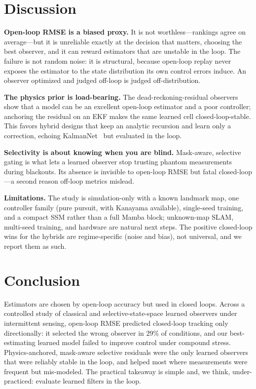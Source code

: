 \documentclass[10pt]{article}
\begin{document}
\section{Discussion}
\textbf{Open-loop RMSE is a biased proxy.} It is not worthless---rankings agree on average---but it
is unreliable exactly at the decision that matters, choosing the best observer, and it can reward
estimators that are unstable in the loop. The failure is not random noise: it is structural, because
open-loop replay never exposes the estimator to the state distribution its own control errors
induce. An observer optimized and judged off-loop is judged off-distribution.

\textbf{The physics prior is load-bearing.} The dead-reckoning-residual observers show that a model
can be an excellent open-loop estimator and a poor controller; anchoring the residual on an EKF
makes the same learned cell closed-loop-stable. This favors hybrid designs that keep an analytic
recursion and learn only a correction, echoing KalmanNet~\cite{kalmannet} but evaluated in the loop.

\textbf{Selectivity is about knowing when you are blind.} Mask-aware, selective gating is what lets
a learned observer stop trusting phantom measurements during blackouts. Its absence is invisible to
open-loop RMSE but fatal closed-loop---a second reason off-loop metrics mislead.

\textbf{Limitations.} The study is simulation-only with a known landmark map, one controller family
(pure pursuit, with Kanayama available), single-seed training, and a compact SSM rather than a
full Mamba block; unknown-map SLAM, multi-seed training, and hardware are natural next steps. The
positive closed-loop wins for the hybrids are regime-specific (noise and bias), not universal, and
we report them as such.

\section{Conclusion}
Estimators are chosen by open-loop accuracy but used in closed loops. Across a controlled study of
classical and selective-state-space learned observers under intermittent sensing, open-loop RMSE
predicted closed-loop tracking only directionally: it selected the wrong observer in $29\%$ of
conditions, and our best-estimating learned model failed to improve control under compound stress.
Physics-anchored, mask-aware selective residuals were the only learned observers that were reliably
stable in the loop, and helped most where measurements were frequent but mis-modeled. The practical
takeaway is simple and, we think, under-practiced: evaluate learned filters in the loop.
\end{document}
